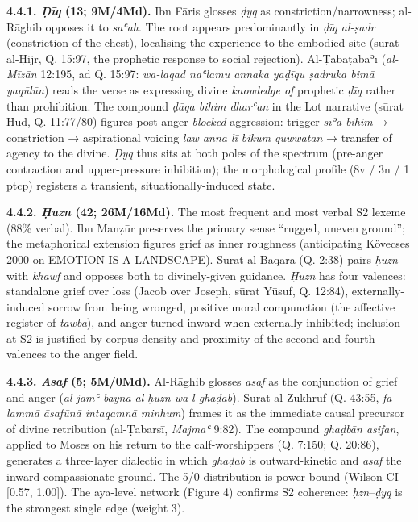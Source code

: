 \documentclass[11pt,a4paper]{article}
\begin{document}
\textbf{4.4.1. \emph{Ḍīq} (13; 9M/4Md).} Ibn Fāris glosses \emph{ḍyq} as
constriction/narrowness; al-Rāghib opposes it to \emph{saʿah}. The root
appears predominantly in \emph{ḍīq al-ṣadr} (constriction of the chest),
localising the experience to the embodied site (sūrat al-Ḥijr, Q. 15:97,
the prophetic response to social rejection). Al-Ṭabāṭabāʾī
(\emph{al-Mīzān} 12:195, ad Q. 15:97: \emph{wa-laqad naʿlamu annaka
yaḍīqu ṣadruka bimā yaqūlūn}) reads the verse as expressing divine
\emph{knowledge of} prophetic \emph{ḍīq} rather than prohibition. The
compound \emph{ḍāqa bihim dharʿan} in the Lot narrative (sūrat Hūd, Q.
11:77/80) figures post-anger \emph{blocked} aggression: trigger
\emph{sīʾa bihim} → constriction → aspirational voicing \emph{law anna
lī bikum quwwatan} → transfer of agency to the divine. \emph{Ḍyq} thus
sits at both poles of the spectrum (pre-anger contraction and
upper-pressure inhibition); the morphological profile (8v / 3n / 1 ptcp)
registers a transient, situationally-induced state.

\textbf{4.4.2. \emph{Ḥuzn} (42; 26M/16Md).} The most frequent and most
verbal S2 lexeme (88\% verbal). Ibn Manẓūr preserves the primary sense
``rugged, uneven ground''; the metaphorical extension figures grief as
inner roughness (anticipating Kövecses 2000 on EMOTION IS A LANDSCAPE).
Sūrat al-Baqara (Q. 2:38) pairs \emph{ḥuzn} with \emph{khawf} and
opposes both to divinely-given guidance. \emph{Ḥuzn} has four valences:
standalone grief over loss (Jacob over Joseph, sūrat Yūsuf, Q. 12:84),
externally-induced sorrow from being wronged, positive moral compunction
(the affective register of \emph{tawba}), and anger turned inward when
externally inhibited; inclusion at S2 is justified by corpus density and
proximity of the second and fourth valences to the anger field.

\textbf{4.4.3. \emph{Asaf} (5; 5M/0Md).} Al-Rāghib glosses \emph{asaf}
as the conjunction of grief and anger (\emph{al-jamʿ bayna al-ḥuzn
wa-l-ghaḍab}). Sūrat al-Zukhruf (Q. 43:55, \emph{fa-lammā āsafūnā
intaqamnā minhum}) frames it as the immediate causal precursor of divine
retribution (al-Ṭabarsī, \emph{Majmaʿ} 9:82). The compound \emph{ghaḍbān
asifan}, applied to Moses on his return to the calf-worshippers (Q.
7:150; Q. 20:86), generates a three-layer dialectic in which
\emph{ghaḍab} is outward-kinetic and \emph{asaf} the
inward-compassionate ground. The 5/0 distribution is power-bound (Wilson
CI {[}0.57, 1.00{]}). The aya-level network (Figure 4) confirms S2
coherence: \emph{ḥzn}--\emph{ḍyq} is the strongest single edge (weight
3).
\end{document}
